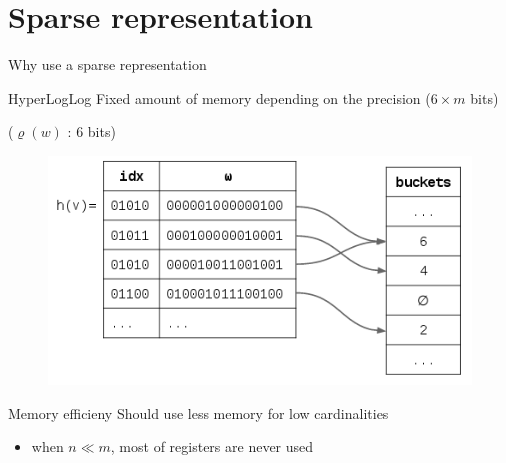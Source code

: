 \documentclass{beamer}
\begin{document}
\section{Sparse representation}
\begin{frame}{Why use a sparse representation}

  \begin{block}{HyperLogLog}
    Fixed amount of memory depending on the precision ($6\times m$ bits)

    ($\varrho(w)$ : 6 bits)
  \end{block}

  \begin{figure}[c]
    \includegraphics [scale=0.4]  {hyperloglog_buckets.png}
  \end{figure}


  \begin{block}{Memory efficieny}
    Should use less memory for low cardinalities
    \begin{itemize}
      \item when $n \ll m$, most of registers are never used 
    \end{itemize}
  \end{block}

\end{frame}
\end{document}
